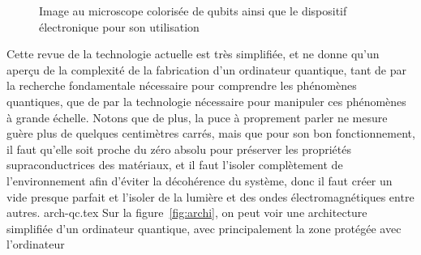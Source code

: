 \begin{figure}[H]
    \centering
    \caption{Image au microscope colorisée de qubits ainsi que le dispositif électronique pour son utilisation~\cite{Hyypp2022}}
    \label{fig:qubit-microscope}
\end{figure}
Cette revue de la technologie actuelle est très simplifiée, et ne donne qu'un
aperçu de la complexité de la fabrication d'un ordinateur quantique, tant de
par la recherche fondamentale nécessaire pour comprendre les phénomènes
quantiques, que de par la technologie nécessaire pour manipuler ces phénomènes
à grande échelle.
Notons que de plus, la puce à proprement parler ne mesure guère plus de quelques
centimètres carrés, mais que pour son bon fonctionnement, il faut qu'elle soit
proche du zéro absolu pour préserver les propriétés supraconductrices des
matériaux, et il faut l'isoler complètement de l'environnement afin d'éviter
la décohérence du système, donc il faut créer un vide presque parfait et l'isoler
de la lumière et des ondes électromagnétiques entre autres.
{arch-qc.tex}
Sur la figure~\ref{fig:archi}, on peut voir une architecture simplifiée d'un
ordinateur quantique, avec principalement la zone protégée avec l'ordinateur
